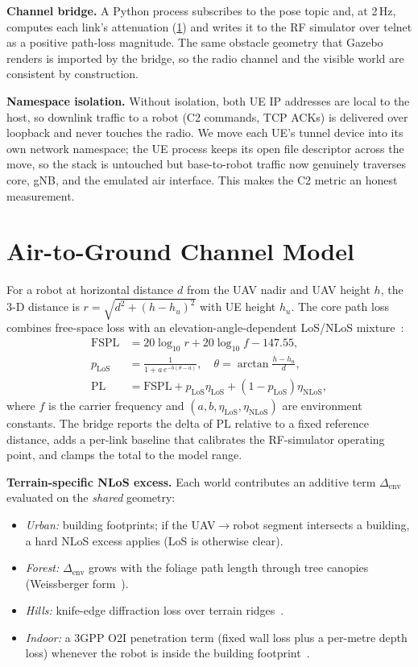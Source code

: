 \documentclass[conference]{IEEEtran}
\begin{document}
\textbf{Channel bridge.} A Python process subscribes to the pose topic and, at
2\,Hz, computes each link's attenuation (\cref{sec:channel}) and writes
it to the RF simulator over telnet as a positive path-loss magnitude. The same
obstacle geometry that Gazebo renders is imported by the bridge, so the radio
channel and the visible world are consistent by construction.

\textbf{Namespace isolation.} Without isolation, both UE IP addresses are local to
the host, so downlink traffic to a robot (C2 commands, TCP ACKs) is delivered over
loopback and never touches the radio. We move each UE's tunnel device into its own
network namespace; the UE process keeps its open file descriptor across the move,
so the stack is untouched but base-to-robot traffic now genuinely traverses core,
gNB, and the emulated air interface. This makes the C2 metric an honest
measurement.

\section{Air-to-Ground Channel Model}
\label{sec:channel}
For a robot at horizontal distance $d$ from the UAV nadir and UAV height $h$, the
3-D distance is $r=\sqrt{d^2+(h-h_u)^2}$ with UE height $h_u$. The core path loss
combines free-space loss with an elevation-angle-dependent LoS/NLoS
mixture~\cite{alhourani2014optimal}:
\begin{align}
\mathrm{FSPL} &= 20\log_{10} r + 20\log_{10} f - 147.55, \\
p_{\mathrm{LoS}} &= \frac{1}{1 + a\,e^{-b(\theta - a)}},\quad
\theta = \arctan\!\frac{h-h_u}{d}, \\
\mathrm{PL} &= \mathrm{FSPL} + p_{\mathrm{LoS}}\eta_{\mathrm{LoS}}
              + (1-p_{\mathrm{LoS}})\eta_{\mathrm{NLoS}},
\end{align}
where $f$ is the carrier frequency and $(a,b,\eta_{\mathrm{LoS}},
\eta_{\mathrm{NLoS}})$ are environment constants. The bridge reports the delta of
$\mathrm{PL}$ relative to a fixed reference distance, adds a per-link baseline that
calibrates the RF-simulator operating point, and clamps the total to the model
range.

\textbf{Terrain-specific NLoS excess.} Each world contributes an additive term
$\Delta_{\mathrm{env}}$ evaluated on the \emph{shared} geometry:
\begin{itemize}
  \item \emph{Urban:} building footprints; if the UAV$\to$robot segment
  intersects a building, a hard NLoS excess applies (LoS is otherwise clear).
  \item \emph{Forest:} $\Delta_{\mathrm{env}}$ grows with the foliage path length
  through tree canopies (Weissberger form~\cite{weissberger1982}).
  \item \emph{Hills:} knife-edge diffraction loss over terrain
  ridges~\cite{ituP526}.
  \item \emph{Indoor:} a 3GPP O2I penetration term (fixed wall loss plus a
  per-metre depth loss) whenever the robot is inside the building
  footprint~\cite{3gpp38901}.
\end{itemize}
\end{document}
